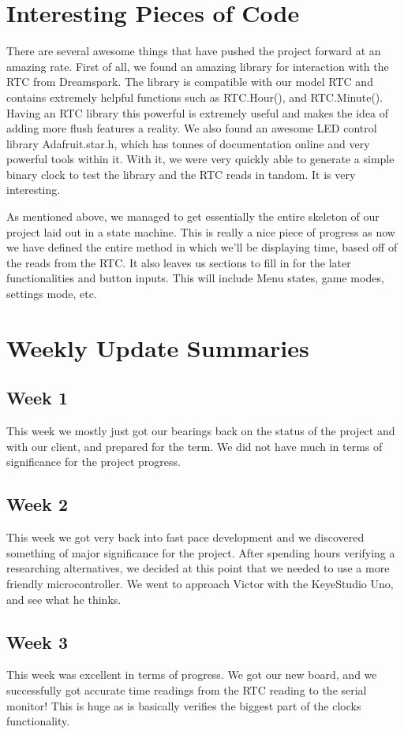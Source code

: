\documentclass[onecolumn, draftclsnofoot,10pt, compsoc]{IEEEtran}
\begin{document}
\section{Interesting Pieces of Code}
There are several awesome things that have pushed the project forward at an amazing rate.
First of all, we found an amazing library for interaction with the RTC from Dreamspark.
The library is compatible with our model RTC and contains extremely helpful functions such as RTC.Hour(), and RTC.Minute().
Having an RTC library this powerful is extremely useful and makes the idea of adding more flush features a reality.
We also found an awesome LED control library Adafruit.star.h, which has tonnes of documentation online and very powerful tools within it.
With it, we were very quickly able to generate a simple binary clock to test the library and the RTC reads in tandom.
It is very interesting.

As mentioned above, we managed to get essentially the entire skeleton of our project laid out in a state machine.
This is really a nice piece of progress as now we have defined the entire method in which we'll be displaying time, based off of the reads from the RTC.
It also leaves us sections to fill in for the later functionalities and button inputs.
This will include Menu states, game modes, settings mode, etc.

\section{Weekly Update Summaries}
\subsection{Week 1}
This week we mostly just got our bearings back on the status of the project and with our client, and prepared for the term.
We did not have much in terms of significance for the project progress.

\subsection{Week 2}
This week we got very back into fast pace development and we discovered something of major significance for the project.
After spending hours verifying a researching alternatives, we decided at this point that we needed to use a more friendly microcontroller.
We went to approach Victor with the KeyeStudio Uno, and see what he thinks.

\subsection{Week 3}
This week was excellent in terms of progress.
We got our new board, and we successfully got accurate time readings from the RTC reading to the serial monitor!
This is huge as is basically verifies the biggest part of the clocks functionality.
\end{document}
